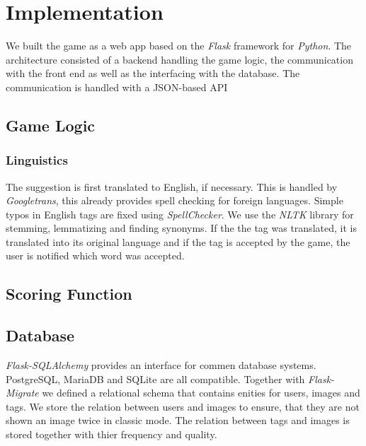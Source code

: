 \section{Implementation}
\label{gXLII:sec:implementation}  %


We built the game as a web app based on the \textit{Flask} framework for \textit{Python}. The architecture consisted of a backend handling the game logic, the communication with the front end as well as the interfacing with the database. The communication is handled with a JSON-based API

\subsection{Game Logic}
\label{gXLII:sec:implementation:game}  %



\subsubsection{Linguistics}
\label{gXLII:sec:implementation:linguistics}  %
The suggestion is first translated to English, if necessary. This is handled by \textit{Googletrans}, this already provides spell checking for foreign languages.
Simple typos in English tags are fixed using \textit{SpellChecker}. We use the \textit{NLTK} library for stemming, lemmatizing and finding synonyms. If the the tag was translated, it is translated into its original language and if the tag is accepted by the game, the user is notified which word was accepted.

\subsection{Scoring Function}

\subsection{Database}
\label{gXLII:sec:implementation:database}  %
\textit{Flask-SQLAlchemy} provides an interface for commen database systems. PostgreSQL, MariaDB and SQLite are all compatible.
Together with \textit{Flask-Migrate} we defined a relational schema that contains enities for users, images and tags. We store the relation between users and images to ensure, that they are not shown an image twice in classic mode. The relation between tags and images is stored together with thier frequency and quality.

